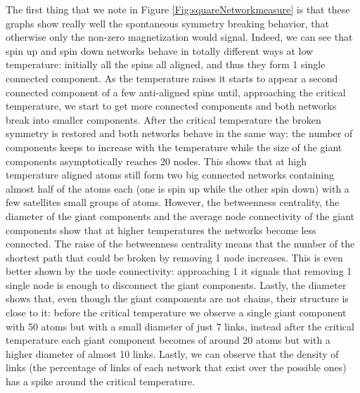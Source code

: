 The first thing that we note in Figure \ref{Fig:squareNetworkmeasure} is that these graphs show really well the spontaneous symmetry breaking behavior, that otherwise only the non-zero magnetization would signal. Indeed, we can see that spin up and spin down networks behave in totally different ways at low temperature: initially all the spins all aligned, and thus they form 1 single connected component. As the temperature raises it starts to appear a second connected component of a few anti-aligned spins until, approaching the critical temperature, we start to get more  connected components and both networks break into smaller components. After the critical temperature the broken symmetry is restored and both networks behave in the same way: the number of components keeps to increase with the temperature while the size of the giant components asymptotically reaches 20 nodes. This shows that at high temperature aligned atoms still form two big connected networks containing almost half of the atoms each (one is spin up while the other spin down) with a few satellites small groups of atoms. However, the betweenness centrality, the diameter of the giant components and the average node connectivity of the giant components show that at higher temperatures the networks become less connected. The raise of the betweenness centrality means that the number of the shortest path that could be broken by removing 1 node increases. This is even better shown by the node connectivity: approaching 1 it signals that removing 1 single node is enough to disconnect the giant components. Lastly, the diameter shows that, even though the giant components are not chains, their structure is close to it: before the critical temperature we observe a single giant component with 50 atoms but with a small diameter of just 7 links, instead after the critical temperature each giant component becomes of around 20 atoms but with a higher diameter of almost 10 links. Lastly, we can observe that the density of links (the percentage of links of each network that exist over the possible ones) has a spike around the critical temperature.

